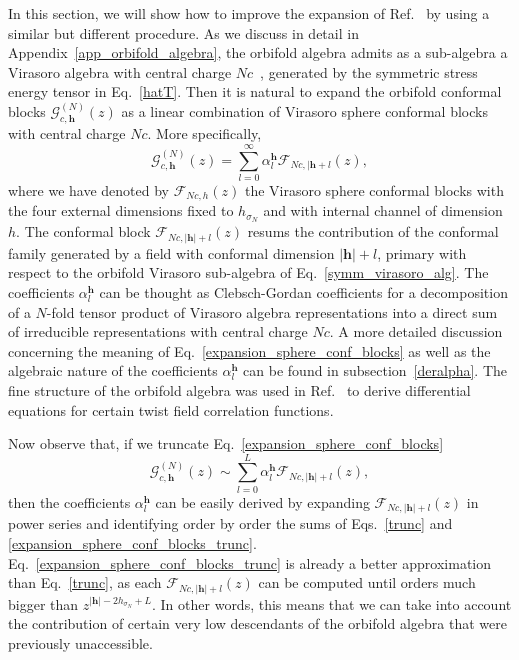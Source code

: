 \documentclass[a4paper,11pt]{article}
\begin{document}
In this section, we will show how to improve the expansion of Ref.~\cite{Collier} by using a similar but different procedure.
As we discuss in detail in Appendix~\ref{app_orbifold_algebra}, the orbifold algebra admits as a sub-algebra a Virasoro algebra with central charge $Nc$~\cite{Borisov}, generated by the symmetric stress energy tensor in Eq.~\eqref{hatT}. Then it is natural to expand the orbifold conformal blocks 
$\mathcal{G}_{c, \boldsymbol{h}}^{(N)}(z)$ as a linear combination of Virasoro sphere conformal blocks with central charge $Nc$. More specifically,
\begin{equation}\label{expansion_sphere_conf_blocks}
 \mathcal{G}_{c, \boldsymbol{h}}^{(N)}(z)=\sum_{l=0}^\infty\alpha_l^{\boldsymbol{h}}\mathcal{F}_{Nc, |\boldsymbol{h}+l}(z),
\end{equation}
where we have  denoted by $\mathcal{F}_{Nc, h }(z)$ the Virasoro sphere conformal blocks with the four external dimensions fixed to  $h_{\sigma_N}$ and with internal channel of dimension $h$. The conformal block $\mathcal{F}_{Nc, |\boldsymbol{h}|+l}(z)$ resums the 
contribution of the conformal family generated by a field with conformal dimension $|\boldsymbol{h}|+l$, primary with respect to the 
orbifold Virasoro sub-algebra of Eq.~\eqref{symm_virasoro_alg}. The coefficients $\alpha_l^{\boldsymbol{h}}$ can be thought as Clebsch-Gordan coefficients for a 
decomposition of a $N$-fold tensor product of Virasoro algebra representations into a direct sum of irreducible representations with central charge $Nc$. A more detailed discussion concerning the meaning of Eq.~\eqref{expansion_sphere_conf_blocks}  as well as the algebraic nature of the coefficients $\alpha_{l}^{\boldsymbol{h}}$ can be found in subsection~\ref{deralpha}. The fine structure of the orbifold algebra was used in Ref.~\cite{Dupic} to derive differential equations for certain twist field correlation functions.

Now observe that, if we truncate Eq.~\eqref{expansion_sphere_conf_blocks}  
\begin{equation}\label{expansion_sphere_conf_blocks_trunc}
 \mathcal{G}_{c, \boldsymbol{h}}^{(N)}(z)\sim\sum_{l=0}^{L}\alpha_{l}^{\boldsymbol{h}}
 \mathcal{F}_{Nc, |\boldsymbol{h}|+l}(z),
\end{equation}
then the coefficients $\alpha_{l}^{\boldsymbol{h}}$ can be easily derived by expanding $\mathcal{F}_{Nc, |\boldsymbol{h}|+l}(z)$ in power series and identifying order by order the sums of Eqs.~\eqref{trunc} and \eqref{expansion_sphere_conf_blocks_trunc}.
Eq.~\eqref{expansion_sphere_conf_blocks_trunc} is already a better approximation than 
Eq.~\eqref{trunc}, as each  $\mathcal{F}_{Nc, |\boldsymbol{h}|+l}(z)$ can be computed until orders much bigger than $z^{|\boldsymbol{h}|-2h_{\sigma_N}+L}$. In other words, this means that we can take into account the contribution of certain very low descendants of the orbifold algebra that were previously unaccessible.
\end{document}
